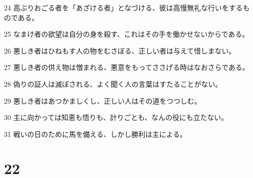 \par 24 高ぶりおごる者を「あざける者」となづける、彼は高慢無礼な行いをするものである。
\par 25 なまけ者の欲望は自分の身を殺す、これはその手を働かせないからである。
\par 26 悪しき者はひねもす人の物をむさぼる、正しい者は与えて惜しまない。
\par 27 悪しき者の供え物は憎まれる、悪意をもってささげる時はなおさらである。
\par 28 偽りの証人は滅ぼされる、よく聞く人の言葉はすたることがない。
\par 29 悪しき者はあつかましくし、正しい人はその道をつつしむ。
\par 30 主に向かっては知恵も悟りも、計りごとも、なんの役にも立たない。
\par 31 戦いの日のために馬を備える、しかし勝利は主による。

\chapter{22}

